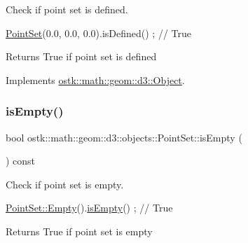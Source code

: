Check if point set is defined. 


\begin{DoxyCode}
\hyperlink{classostk_1_1math_1_1geom_1_1d3_1_1objects_1_1_point_set_a285835d8348a60ceaf227bd76e3a5546}{PointSet}(0.0, 0.0, 0.0).isDefined() ; \textcolor{comment}{// True}
\end{DoxyCode}


\begin{DoxyReturn}{Returns}
True if point set is defined 
\end{DoxyReturn}


Implements \hyperlink{classostk_1_1math_1_1geom_1_1d3_1_1_object_a271a1964cd208be85ce9a0a429395ad8}{ostk\+::math\+::geom\+::d3\+::\+Object}.

\mbox{\label{classostk_1_1math_1_1geom_1_1d3_1_1objects_1_1_point_set_a107e4bdbcee1586d393d804428889049}} 
\subsubsection{\texorpdfstring{is\+Empty()}{isEmpty()}}
{\footnotesize\ttfamily bool ostk\+::math\+::geom\+::d3\+::objects\+::\+Point\+Set\+::is\+Empty (\begin{DoxyParamCaption}{ }\end{DoxyParamCaption}) const}



Check if point set is empty. 


\begin{DoxyCode}
\hyperlink{classostk_1_1math_1_1geom_1_1d3_1_1objects_1_1_point_set_a1b14ed7d73ee7ac5e2796cf44f06ffe9}{PointSet::Empty}().\hyperlink{classostk_1_1math_1_1geom_1_1d3_1_1objects_1_1_point_set_a107e4bdbcee1586d393d804428889049}{isEmpty}() ; \textcolor{comment}{// True}
\end{DoxyCode}


\begin{DoxyReturn}{Returns}
True if point set is empty 
\end{DoxyReturn}
\mbox{\label{classostk_1_1math_1_1geom_1_1d3_1_1objects_1_1_point_set_a5ee3cc0360a12ff12dc960f6a09aacc2}} 
